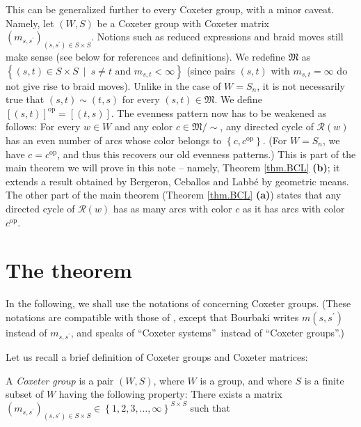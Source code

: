 \documentclass[numbers=enddot,12pt,final,onecolumn,notitlepage,abstracton]{scrartcl}%
\theoremstyle{definition}
\begin{document}
This can be generalized further to every Coxeter group, with a minor caveat.
Namely, let $\left(  W,S\right)  $ be a Coxeter group with Coxeter matrix
$\left(  m_{s,s^{\prime}}\right)  _{\left(  s,s^{\prime}\right)  \in S\times
S}$. Notions such as reduced expressions and braid moves still make sense (see
below for references and definitions). We redefine $\mathfrak{M}$ as $\left\{
\left(  s,t\right)  \in S\times S\ \mid\ s\neq t\text{ and }m_{s,t}%
<\infty\right\}  $ (since pairs $\left(  s,t\right)  $ with $m_{s,t}=\infty$
do not give rise to braid moves). Unlike in the case of $W=S_{n}$, it is not
necessarily true that $\left(  s,t\right)  \sim\left(  t,s\right)  $ for every
$\left(  s,t\right)  \in\mathfrak{M}$. We define $\left[  \left(  s,t\right)
\right]  ^{\operatorname*{op}}=\left[  \left(  t,s\right)  \right]  $. The
evenness pattern now has to be weakened as follows: For every $w\in W$ and any
color $c\in\mathfrak{M}/\sim$, any directed cycle of $\mathcal{R}\left(
w\right)  $ has an even number of arcs whose color belongs to $\left\{
c,c^{\operatorname*{op}}\right\}  $. (For $W=S_{n}$, we have
$c=c^{\operatorname*{op}}$, and thus this recovers our old evenness patterns.)
This is part of the main theorem we will prove in this note -- namely, Theorem
\ref{thm.BCL} \textbf{(b)}; it extends a result \cite[Theorem 3.1]{BCL}
obtained by Bergeron, Ceballos and Labb\'{e} by geometric means. The other
part of the main theorem (Theorem \ref{thm.BCL} \textbf{(a)}) states that any
directed cycle of $\mathcal{R}\left(  w\right)  $ has as many arcs with color
$c$ as it has arcs with color $c^{\operatorname*{op}}$.


\section{The theorem}

In the following, we shall use the notations of \cite[\S 1]{Lusztig-Hecke}
concerning Coxeter groups. (These notations are compatible with those of
\cite[Chapter 4]{Bourbaki4-6}, except that Bourbaki writes $m\left(
s,s^{\prime}\right)  $ instead of $m_{s,s^{\prime}}$, and speaks of
\textquotedblleft Coxeter systems\textquotedblright\ instead of
\textquotedblleft Coxeter groups\textquotedblright.)

Let us recall a brief definition of Coxeter groups and Coxeter matrices:

A \emph{Coxeter group} is a pair $\left(  W,S\right)  $, where $W$ is a group,
and where $S$ is a finite subset of $W$ having the following property: There
exists a matrix $\left(  m_{s,s^{\prime}}\right)  _{\left(  s,s^{\prime
}\right)  \in S\times S}\in\left\{  1,2,3,\ldots,\infty\right\}  ^{S\times S}$
such that
\end{document}
